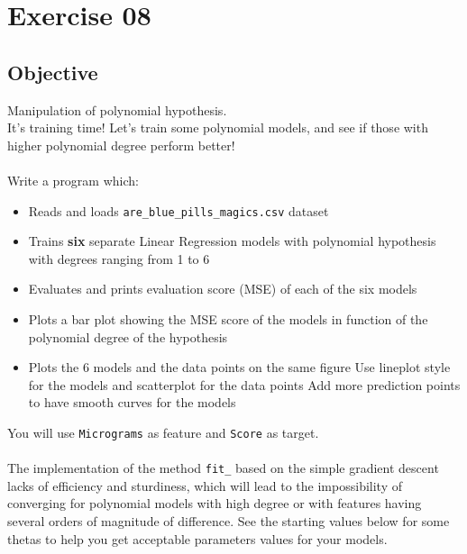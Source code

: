 \chapter{Exercise 08}

\newpage
{}
\makeheaderfilesforbidden


\section*{Objective}
Manipulation of polynomial hypothesis.\\
\newline
It's training time! Let's train some polynomial models, and see if those with higher polynomial degree perform better!\\
\\
Write a program which:
\begin{itemize}
  \item Reads and loads \texttt{are\_blue\_pills\_magics.csv} dataset
  \item Trains \textbf{six} separate Linear Regression models with polynomial hypothesis with degrees ranging from 1 to 6
  \item Evaluates and prints evaluation score (MSE) of each of the six models
  \item Plots a bar plot showing the MSE score of the models in function of the polynomial degree of the hypothesis
  \item Plots the 6 models and the data points on the same figure
        Use lineplot style for the models and scatterplot for the data points
        Add more prediction points to have smooth curves for the models
\end{itemize}
You will use \texttt{Micrograms} as feature and \texttt{Score} as target.\\
\\
The implementation of the method \texttt{fit\_} based on the simple gradient descent lacks of efficiency and sturdiness,
which will lead to the impossibility of converging for polynomial models with high degree or with features having several orders of magnitude of difference.
See the starting values below for some thetas to help you get acceptable parameters values for your models.\\
\\

